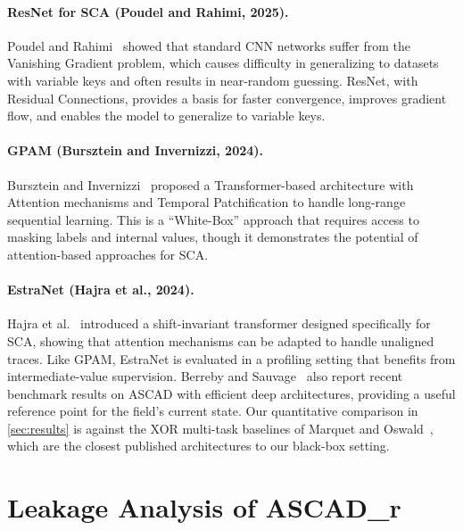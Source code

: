 \documentclass[runningheads]{llncs}
\begin{document}
\paragraph{ResNet for SCA (Poudel and Rahimi, 2025).}
Poudel and Rahimi~\cite{poudel2025machine} showed that standard CNN networks suffer from the Vanishing Gradient problem, which causes difficulty in generalizing to datasets with variable keys and often results in near-random guessing.
ResNet, with Residual Connections, provides a basis for faster convergence, improves gradient flow, and enables the model to generalize to variable keys.

\paragraph{GPAM (Bursztein and Invernizzi, 2024).}
Bursztein and Invernizzi~\cite{bursztein2024gpam} proposed a Transformer-based architecture with Attention mechanisms and Temporal Patchification to handle long-range sequential learning.
This is a ``White-Box'' approach that requires access to masking labels and internal values, though it demonstrates the potential of attention-based approaches for SCA.

\paragraph{EstraNet (Hajra et al., 2024).}
Hajra et al.~\cite{hajra2024estranet} introduced a shift-invariant transformer designed specifically for SCA, showing that attention mechanisms can be adapted to handle unaligned traces.
Like GPAM, EstraNet is evaluated in a profiling setting that benefits from intermediate-value supervision.
Berreby and Sauvage~\cite{berreby2023investigating} also report recent benchmark results on ASCAD with efficient deep architectures, providing a useful reference point for the field's current state.
Our quantitative comparison in \cref{sec:results} is against the XOR multi-task baselines of Marquet and Oswald~\cite{marquet2024exploring}, which are the closest published architectures to our black-box setting.


\section{Leakage Analysis of ASCAD\_r}\label{sec:snr}

\end{document}
